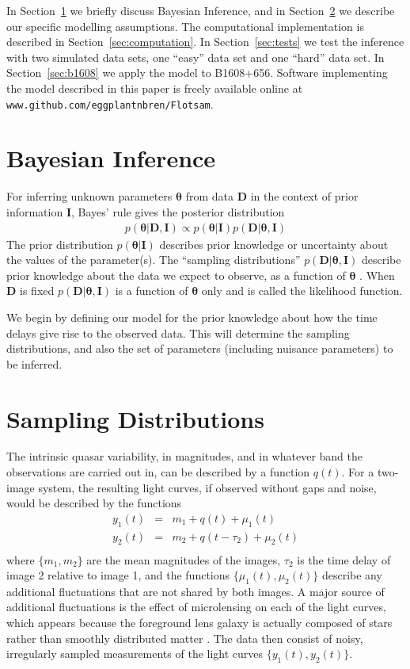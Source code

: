 \documentclass[useAMS,usenatbib, a4paper]{mn2e} \usepackage{natbib}
\newcommand{\params}{\boldsymbol{\theta}}
\newcommand{\data}{\boldsymbol{D}}
\newcommand{\info}{\boldsymbol{I}}
\begin{document}
In Section~\ref{sec:bayes} we briefly discuss Bayesian Inference, and in
Section~\ref{sec:sampling} we describe our specific
modelling assumptions. The computational implementation is described in
Section~\ref{sec:computation}. In Section~\ref{sec:tests} we test the inference
with two simulated data sets, one ``easy'' data set and one ``hard'' data set.
In Section~\ref{sec:b1608} we apply the model to B1608+656. Software implementing
the model described in this paper is freely available online at
{\tt www.github.com/eggplantnbren/Flotsam}.


\section{Bayesian Inference}\label{sec:bayes}
For inferring unknown parameters $\params$ from data $\data$ in the context
of prior information $\info$,
Bayes' rule gives the posterior distribution
\begin{eqnarray}
p(\params | \data, \info) \propto p(\params|\info)p(\data|\params, \info)
\end{eqnarray}
The prior distribution $p(\params|\info)$ describes prior knowledge or uncertainty
about the values of the parameter(s). The ``sampling distributions''
$p(\data|\params,\info)$
describe prior knowledge about the data we expect to observe, as a function of
$\params$ \citep{caticha}. When $\data$ is fixed $p(\data|\params,\info)$ is a function of
$\params$ only and is called the likelihood function.

We begin by defining our model for the prior knowledge about how the time
delays give rise to the observed data. This will determine the sampling
distributions, and also the set of parameters (including nuisance parameters) to
be inferred.

\section{Sampling Distributions}\label{sec:sampling}
The intrinsic quasar variability, in magnitudes, and in whatever band the
observations are carried out in, can be described by a function $q(t)$. For a
two-image system, the resulting light curves, if observed without gaps and
noise, would be described by the functions
\begin{eqnarray}
y_1(t) &=& m_1 + q(t) + \mu_1(t) \\
y_2(t) &=& m_2 + q(t - \tau_2) + \mu_2(t) \\
\end{eqnarray}
where $\{m_1, m_2\}$ are the mean magnitudes of the images,
$\tau_2$ is the time delay of image 2 relative to image 1, and the
functions $\{\mu_1(t), \mu_2(t)\}$ describe any additional fluctuations that
are not shared by both images. A major source of additional fluctuations
is the effect of
microlensing on each of the light curves, which appears because the foreground
lens galaxy is actually composed of stars rather than smoothly
distributed matter \citep{falco}.
The data then consist of
noisy, irregularly sampled measurements of the light curves
$\{y_1(t), y_2(t)\}$.
\end{document}
